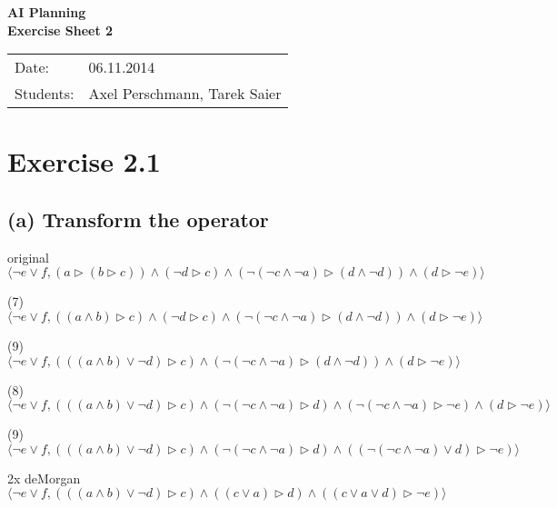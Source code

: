 \documentclass[11pt,a4paper]{article}
\begin{document}
\begin{center}
\Huge{\textbf{AI Planning}}\\
\LARGE{\textbf{Exercise Sheet 2}}
\end{center}
\vspace{2cm}
\begin{tabular}{ll}
Date: & 06.11.2014\\
Students: & Axel Perschmann, Tarek Saier
\end{tabular}

\section*{Exercise 2.1}
\subsection*{(a) Transform the operator}

original \newline
$ \langle
    \neg e \lor f ,
  (a \triangleright ( b \triangleright c))   \land
  (\neg d \triangleright c)  \land
  ( \neg (\neg c \land \neg a) \triangleright (d \land \neg d) )   \land
  (d \triangleright \neg e)  
  \rangle
$

(7) \newline
$ \langle
    \neg e \lor f ,
  ((a \land b) \triangleright c)   \land
  (\neg d \triangleright c)  \land
  ( \neg (\neg c \land \neg a) \triangleright (d \land \neg d) )   \land
  (d \triangleright \neg e)  
  \rangle
$

(9) \newline
$ \langle
    \neg e \lor f ,
  (((a \land b) \lor \neg d) \triangleright c)  \land
  ( \neg (\neg c \land \neg a) \triangleright (d \land \neg d) )   \land
  (d \triangleright \neg e)  
  \rangle
$

(8) \newline
$ \langle
    \neg e \lor f ,
  (((a \land b) \lor \neg d) \triangleright c)  \land
  ( \neg (\neg c \land \neg a) \triangleright d )   \land
  ( \neg (\neg c \land \neg a) \triangleright \neg e )   \land
  (d \triangleright \neg e)  
  \rangle
$

(9) \newline
$ \langle
    \neg e \lor f ,
  (((a \land b) \lor \neg d) \triangleright c)  \land
  ( \neg (\neg c \land \neg a) \triangleright d )   \land
  (( \neg (\neg c \land \neg a) \lor d) \triangleright \neg e)  
  \rangle
$

2x deMorgan \newline
$ \langle
    \neg e \lor f ,
  (((a \land b) \lor \neg d) \triangleright c)  \land
  (( c \lor a) \triangleright d )   \land
  (( c \lor a \lor d) \triangleright \neg e)
  \rangle  
$
\end{document}
